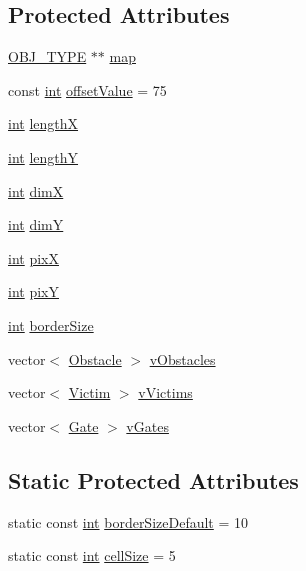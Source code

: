 \subsection*{Protected Attributes}
\begin{DoxyCompactItemize}
\item 
\mbox{\hyperlink{map_8hh_a714b9c2c276fbae637fee36453d9121e}{O\+B\+J\+\_\+\+T\+Y\+PE}} $\ast$$\ast$ \mbox{\hyperlink{class_mapp_a91181e95875bc82d03e832b9d901cb59}{map}}
\item 
const \mbox{\hyperlink{draw_8hh_aa620a13339ac3a1177c86edc549fda9b}{int}} \mbox{\hyperlink{class_mapp_a7a9008b7100b25833c4aff1753dc8eec}{offset\+Value}} = 75
\item 
\mbox{\hyperlink{draw_8hh_aa620a13339ac3a1177c86edc549fda9b}{int}} \mbox{\hyperlink{class_mapp_add62ddc7c9bf47dcf3dc8916dc58d41c}{lengthX}}
\item 
\mbox{\hyperlink{draw_8hh_aa620a13339ac3a1177c86edc549fda9b}{int}} \mbox{\hyperlink{class_mapp_ad108cf6f9d0fa2f7b24405938dd7f74c}{lengthY}}
\item 
\mbox{\hyperlink{draw_8hh_aa620a13339ac3a1177c86edc549fda9b}{int}} \mbox{\hyperlink{class_mapp_aeb3ba1ee2b2ac64b01a459b85610f524}{dimX}}
\item 
\mbox{\hyperlink{draw_8hh_aa620a13339ac3a1177c86edc549fda9b}{int}} \mbox{\hyperlink{class_mapp_a7d830edb47e7a9b8d2574e53150a906c}{dimY}}
\item 
\mbox{\hyperlink{draw_8hh_aa620a13339ac3a1177c86edc549fda9b}{int}} \mbox{\hyperlink{class_mapp_a0d751ee7f6aacc352c1ffb1bf95c21af}{pixX}}
\item 
\mbox{\hyperlink{draw_8hh_aa620a13339ac3a1177c86edc549fda9b}{int}} \mbox{\hyperlink{class_mapp_a756d60b3d694342b7c75621c8559c00e}{pixY}}
\item 
\mbox{\hyperlink{draw_8hh_aa620a13339ac3a1177c86edc549fda9b}{int}} \mbox{\hyperlink{class_mapp_a396e22007b8acd6231f9bd91d263f84f}{border\+Size}}
\item 
vector$<$ \mbox{\hyperlink{class_obstacle}{Obstacle}} $>$ \mbox{\hyperlink{class_mapp_adfc09e7e4750c47c7a3d2fe2f30241f8}{v\+Obstacles}}
\item 
vector$<$ \mbox{\hyperlink{class_victim}{Victim}} $>$ \mbox{\hyperlink{class_mapp_a3cd9951fd2f55c83de0c9441249b79db}{v\+Victims}}
\item 
vector$<$ \mbox{\hyperlink{class_gate}{Gate}} $>$ \mbox{\hyperlink{class_mapp_ad33044227affb6fc91f1a795ca3fab4a}{v\+Gates}}
\end{DoxyCompactItemize}
\subsection*{Static Protected Attributes}
\begin{DoxyCompactItemize}
\item 
static const \mbox{\hyperlink{draw_8hh_aa620a13339ac3a1177c86edc549fda9b}{int}} \mbox{\hyperlink{class_mapp_aef8bde83114714a4ce4ad9d13766e761}{border\+Size\+Default}} = 10
\item 
static const \mbox{\hyperlink{draw_8hh_aa620a13339ac3a1177c86edc549fda9b}{int}} \mbox{\hyperlink{class_mapp_a8216044ff8e95ba054985e26ae1c75f8}{cell\+Size}} = 5
\end{DoxyCompactItemize}



